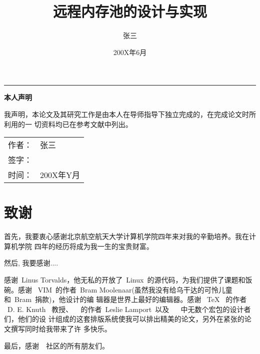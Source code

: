 \documentclass[xelatex, adobefonts]{BUAApaper}
\begin{document}
\author{张三}
\title{远程内存池的设计与实现}
\date{200X年6月}

\maketitle
{}
\setcounter{page}{0}

\frontmatter
\newpage
\begingroup
\hrule width0bp
\vskip54bp
\centerline{\bf{}本人声明}
\vskip27bp
我声明，本论文及其研究工作是由本人在导师指导下独立完成的，在完成论文时所利用的一
切资料均已在参考文献中列出。
\vskip63bp
\hfill	\begin{tabular}{cl}
		作者：&张三\\
		签字：&\vrule width0pt height10bp depth10bp{}\\
		时间：& 200X年Y月
	\end{tabular}
\endgroup


\tableofcontents
\newpage
\mainmatter



\newpage
\renewcommand{\thesection}{致谢}
\section*{致谢}

首先，我要衷心感谢北京航空航天大学计算机学院四年来对我的辛勤培养。我在计算机学院
四年的经历将成为我一生的宝贵财富。

然后, 我要感谢....

感谢~Linus Torvalds，他无私的开放了~Linux~的源代码，为我们提供了课题和饭碗。感谢
~VIM~的作者~Bram Moolenaar(虽然我没有给乌干达的可怜儿童和~Bram~捐款)，他设计的编
辑器是世界上最好的编辑器。感谢 ~\TeX{}~ 的作者 ~D. E. Knuth~ 教授、
~\LaTeXe{} 的作者~Leslie Lamport~以及 ~\LaTeXe{}~ 中无数个宏包的设计者们，他们的设
计组成的这套排版系统使我可以排出精美的论文，另外在紧张的论文撰写同时给我带来了许
多快乐。

最后，感谢~\CTeX~社区的所有朋友们。

\nocite{*}
\newpage
{}
\appendix



\clearpage
\end{document}
